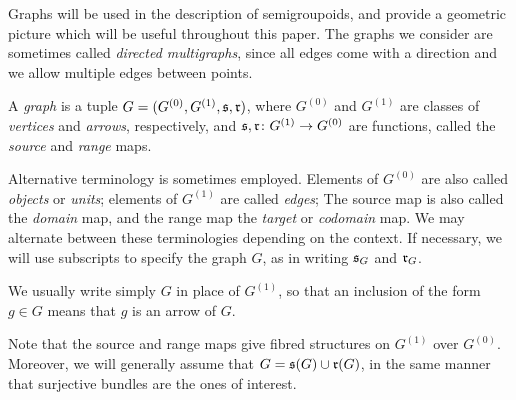 Graphs will be used in the description of semigroupoids, and provide a geometric picture which will be useful throughout this paper. The graphs we consider are sometimes called \emph{directed multigraphs}, since all edges come with a direction and we allow multiple edges between points.

\begin{definition}
A \emph{graph} is a tuple $G=(G^{(0)},G^{(1)},\operatorname{\mathfrak{s}},\operatorname{\mathfrak{r}})$, where $G^{(0)}$ and $G^{(1)}$ are classes of \emph{vertices} and \emph{arrows}, respectively, and $\operatorname{\mathfrak{s}},\operatorname{\mathfrak{r}}\colon G^{(1)}\to G^{(0)}$ are functions, called the \emph{source} and \emph{range} maps.
\end{definition}

Alternative terminology is sometimes employed. Elements of $G^{(0)}$ are also called \emph{objects} or \emph{units}; elements of $G^{(1)}$ are called \emph{edges}; The source map is also called the \emph{domain} map, and the range map the \emph{target} or \emph{codomain} map. We may alternate between these terminologies depending on the context. If necessary, we will use subscripts to specify the graph $G$, as in writing $\operatorname{\mathfrak{s}}_G$ and $\operatorname{\mathfrak{r}}_G$.

We usually write simply $G$ in place of $G^{(1)}$, so that an inclusion of the form $g\in G$ means that $g$ is an arrow of $G$.

Note that the source and range maps give fibred structures on $G^{(1)}$ over $G^{(0)}$. Moreover, we will generally assume that $G=\operatorname{\mathfrak{s}}(G)\cup\operatorname{\mathfrak{r}}(G)$, in the same manner that surjective bundles are the ones of interest.

